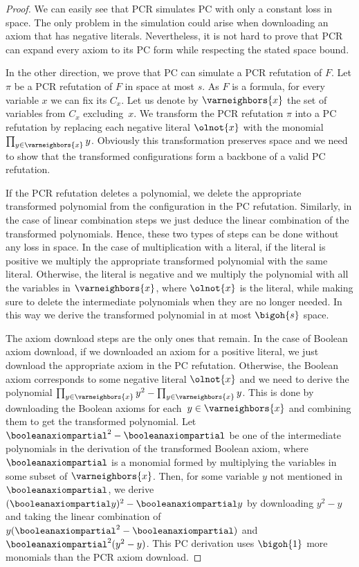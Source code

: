 \documentclass{toc}
\begin{document}
\begin{proof}
  We can easily see that PCR simulates PC with only a constant loss in
  space. The only problem in the simulation could arise when
  downloading an axiom that has negative literals. Nevertheless, it is
  not hard to prove that PCR can expand every axiom to its PC form
  while respecting the stated space bound.

  In the other direction, we prove that PC can simulate a PCR
  refutation of $F$. Let $\pi$ be a PCR refutation of $F$ in space at
  most $s$. As $F$ is a \varweightconstrained{} formula, for every
  variable $x$ we can fix its  $C_x$. Let us
  denote by $\varneighbors{x}$ the set of variables from $C_x$
  excluding~$x$. We transform the PCR refutation $\pi$ into a PC
  refutation by replacing each negative literal $\olnot{x}$ with the
  monomial $\prod_{y \in \varneighbors{x}} y$. Obviously this
  transformation preserves space and we need to show that the
  transformed configurations form a backbone of a valid PC refutation.

  If the PCR refutation deletes a polynomial, we delete the
  appropriate transformed polynomial from the configuration in the
  PC refutation. Similarly, in the case of linear combination steps we
  just deduce the linear combination of the transformed
  polynomials. Hence, these two types of steps can be done without any
  loss in space. In the case of multiplication with a literal, if the
  literal is positive we multiply the appropriate transformed
  polynomial with the same literal. Otherwise, the literal is negative
  and we multiply the polynomial with all the variables in
  $\varneighbors{x}$, where $\olnot{x}$ is the literal, while making
  sure to delete the intermediate polynomials when they are no longer
  needed. In this way we derive the transformed polynomial in at most
  $\bigoh{s}$ space.

  The axiom download steps are the only ones that remain. In the case
  of Boolean axiom download, if we downloaded an axiom for a positive
  literal, we just download the appropriate axiom in the PC
  refutation. Otherwise, the Boolean axiom corresponds to some
  negative literal $\olnot{x}$ and we need to derive the polynomial
  $\prod_{y \in \varneighbors{x}} y^2 - \prod_{y \in \varneighbors{x}}
  y$. This is done by downloading the Boolean axioms for each~$y \in
  \varneighbors{x}$ and combining them to get the transformed
  polynomial. Let $\booleanaxiompartial^2 - \booleanaxiompartial$ be
  one of the intermediate polynomials in the derivation of the
  transformed Boolean axiom, where $\booleanaxiompartial$ is a
  monomial formed by multiplying the variables in some subset of
  $\varneighbors{x}$. Then, for some variable $y$ not mentioned in
  $\booleanaxiompartial$, we derive $(\booleanaxiompartial y)^2 -
  \booleanaxiompartial y$ by downloading $y^2 - y$ and taking the
  linear combination of $y(\booleanaxiompartial^2 -
  \booleanaxiompartial)$ and $\booleanaxiompartial^2(y^2 - y)$. This
  PC derivation uses $\bigoh{1}$ more monomials than the PCR axiom
  download.


\end{proof}
\end{document}
